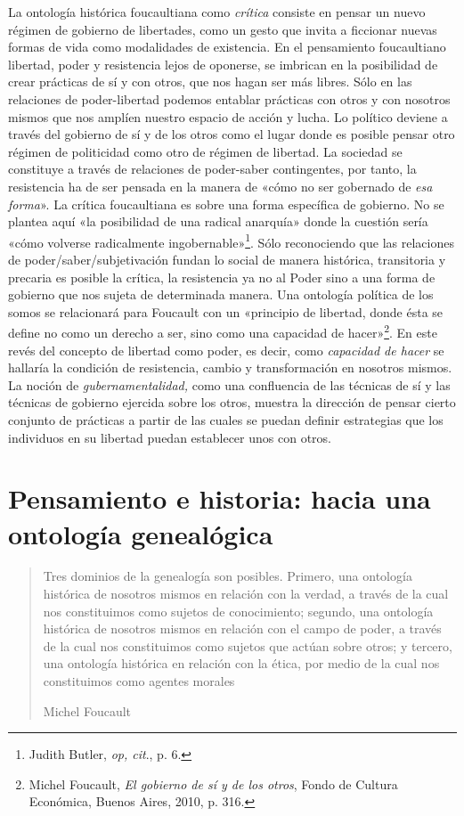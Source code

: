 La ontología histórica foucaultiana como \emph{crítica} consiste en pensar un nuevo régimen de gobierno de libertades, como un gesto que invita a ficcionar nuevas formas de vida como modalidades de existencia. En el pensamiento foucaultiano libertad, poder y resistencia lejos de oponerse, se imbrican en la posibilidad de crear prácticas de sí y con otros, que nos hagan ser más libres. Sólo en las relaciones de poder-libertad podemos entablar prácticas con otros y con nosotros mismos que nos amplíen nuestro espacio de acción y lucha. Lo político deviene a través del gobierno de sí y de los otros como el lugar donde es posible pensar otro régimen de politicidad como otro de régimen de libertad. La sociedad se constituye a través de relaciones de poder-saber contingentes, por tanto, la resistencia ha de ser pensada en la manera de «cómo no ser gobernado de \emph{esa forma}». La crítica foucaultiana es sobre una forma específica de gobierno. No se plantea aquí «la posibilidad de una radical anarquía» donde la cuestión sería «cómo volverse radicalmente ingobernable»\footnote{Judith Butler, \emph{op, cit}., p. 6.}. Sólo reconociendo que las relaciones de poder/saber/subjetivación fundan lo social de manera histórica, transitoria y precaria es posible la crítica, la resistencia ya no al Poder sino a una forma de gobierno que nos sujeta de determinada manera. Una ontología política de los somos se relacionará para Foucault con un «principio de libertad, donde ésta se define no como un derecho a ser, sino como una capacidad de hacer»\footnote{Michel Foucault, \emph{El gobierno de sí y de los otros}, Fondo de Cultura Económica, Buenos Aires, 2010, p. 316.}. En este revés del concepto de libertad como poder, es decir, como \emph{capacidad de hacer} se hallaría la condición de resistencia, cambio y transformación en nosotros mismos. La noción de \emph{gubernamentalidad,} como una confluencia de las técnicas de sí y las técnicas de gobierno ejercida sobre los otros, muestra la dirección de pensar cierto conjunto de prácticas a partir de las cuales se puedan definir estrategias que los individuos en su libertad puedan establecer unos con otros.

\section{Pensamiento e historia: hacia una ontología genealógica}

\begin{quote}
Tres dominios de la genealogía son posibles. Primero, una ontología histórica de nosotros mismos en relación con la verdad, a través de la cual nos constituimos como sujetos de conocimiento; segundo, una ontología histórica de nosotros mismos en relación con el campo de poder, a través de la cual nos constituimos como sujetos que actúan sobre otros; y tercero, una ontología histórica en relación con la ética, por medio de la cual nos constituimos como agentes morales

Michel Foucault
\end{quote}


